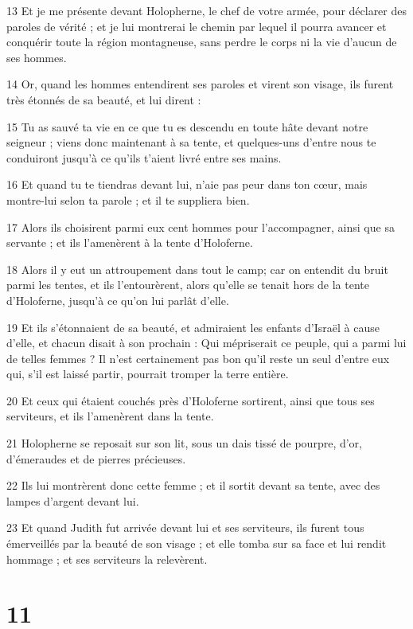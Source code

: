 \par 13 Et je me présente devant Holopherne, le chef de votre armée, pour déclarer des paroles de vérité ; et je lui montrerai le chemin par lequel il pourra avancer et conquérir toute la région montagneuse, sans perdre le corps ni la vie d'aucun de ses hommes.
\par 14 Or, quand les hommes entendirent ses paroles et virent son visage, ils furent très étonnés de sa beauté, et lui dirent :
\par 15 Tu as sauvé ta vie en ce que tu es descendu en toute hâte devant notre seigneur ; viens donc maintenant à sa tente, et quelques-uns d'entre nous te conduiront jusqu'à ce qu'ils t'aient livré entre ses mains.
\par 16 Et quand tu te tiendras devant lui, n'aie pas peur dans ton cœur, mais montre-lui selon ta parole ; et il te suppliera bien.
\par 17 Alors ils choisirent parmi eux cent hommes pour l'accompagner, ainsi que sa servante ; et ils l'amenèrent à la tente d'Holoferne.
\par 18 Alors il y eut un attroupement dans tout le camp; car on entendit du bruit parmi les tentes, et ils l'entourèrent, alors qu'elle se tenait hors de la tente d'Holoferne, jusqu'à ce qu'on lui parlât d'elle.
\par 19 Et ils s'étonnaient de sa beauté, et admiraient les enfants d'Israël à cause d'elle, et chacun disait à son prochain : Qui mépriserait ce peuple, qui a parmi lui de telles femmes ? Il n'est certainement pas bon qu'il reste un seul d'entre eux qui, s'il est laissé partir, pourrait tromper la terre entière.
\par 20 Et ceux qui étaient couchés près d'Holoferne sortirent, ainsi que tous ses serviteurs, et ils l'amenèrent dans la tente.
\par 21 Holopherne se reposait sur son lit, sous un dais tissé de pourpre, d'or, d'émeraudes et de pierres précieuses.
\par 22 Ils lui montrèrent donc cette femme ; et il sortit devant sa tente, avec des lampes d'argent devant lui.
\par 23 Et quand Judith fut arrivée devant lui et ses serviteurs, ils furent tous émerveillés par la beauté de son visage ; et elle tomba sur sa face et lui rendit hommage ; et ses serviteurs la relevèrent.

\chapter{11}

